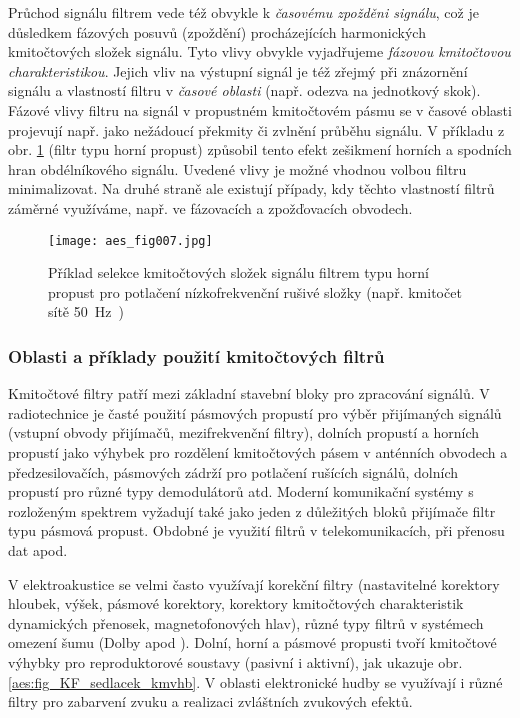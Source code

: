 {      Průchod signálu filtrem vede též obvykle k \emph{časovému zpožděni signálu}, což je důsledkem
      fázových posuvů (zpoždění) procházejících harmonických kmitočtových složek signálu. Ty\-to 
      vlivy obvykle vyjadřujeme \emph{fázovou kmitočtovou charakteristikou}. Jejich vliv na výstupní
      signál je též zřejmý při znázornění signálu a vlastností filtru v \emph{časové oblasti} (např.
      odezva na jednotkový skok). Fázové vlivy filtru na signál v propustném kmitočtovém pásmu se v
      časové oblasti projevují např. jako nežádoucí překmity či zvlnění průběhu signálu. V příkladu
      z obr. \ref{aes:fig007} (filtr typu horní propust) způsobil tento efekt zešikmení horních a 
      spodních hran obdélníkového signálu. Uvedené vlivy je možné vhodnou volbou filtru 
      minimalizovat. Na druhé straně ale existují případy, kdy těchto vlastností filtrů záměrné 
      využíváme, např. ve fázovacích a zpožďovacích obvodech.

      \begin{figure}[ht!]
        \centering
        \texttt{[image: aes\_fig007.jpg]}
        \caption{Příklad selekce kmitočtových složek signálu filtrem typu horní propust pro 
                 potlačení nízkofrekvenční rušivé složky (např. kmitočet sítě \SI{50}{\Hz)}}
        \label{aes:fig007}    
      \end{figure} 
        
      \subsubsection{Oblasti a příklady použití kmitočtových filtrů}
        Kmitočtové filtry patří mezi základní stavební bloky pro zpracování signálů. V radiotechnice
        je časté použití pásmových propustí pro výběr přijímaných signálů (vstupní obvody přijímačů,
        mezifrekvenční filtry), dolních propustí a horních propustí jako výhybek pro rozdělení
        kmitočtových pásem v anténních obvodech a předzesilovačích, pásmových zádrží pro potlačení 
        rušících signálů, dolních propustí pro různé typy demodulátorů atd. Moderní komunikační 
        systémy s rozloženým spektrem vyžadují také jako jeden z důležitých bloků přijímače filtr 
        typu pásmová propust. Obdobné je využití filtrů v telekomunikacích, při přenosu dat apod.
    
        V elektroakustice se velmi často využívají korekční filtry (nastavitelné korektory hloubek,
        výšek, pásmové korektory, korektory kmitočtových charakteristik dynamických přenosek,
        magnetofonových hlav), různé typy filtrů v systémech omezení šumu (Dolby apod ). Dolní,
        horní a pásmové propusti tvoří kmitočtové výhybky pro reproduktorové soustavy (pasivní i
        aktivní), jak ukazuje obr. \ref{aes:fig_KF_sedlacek_kmvhb}. V oblasti elektronické hudby se
        využívají i různé filtry pro zabarvení zvuku a realizaci zvláštních zvukových efektů.
      
}
